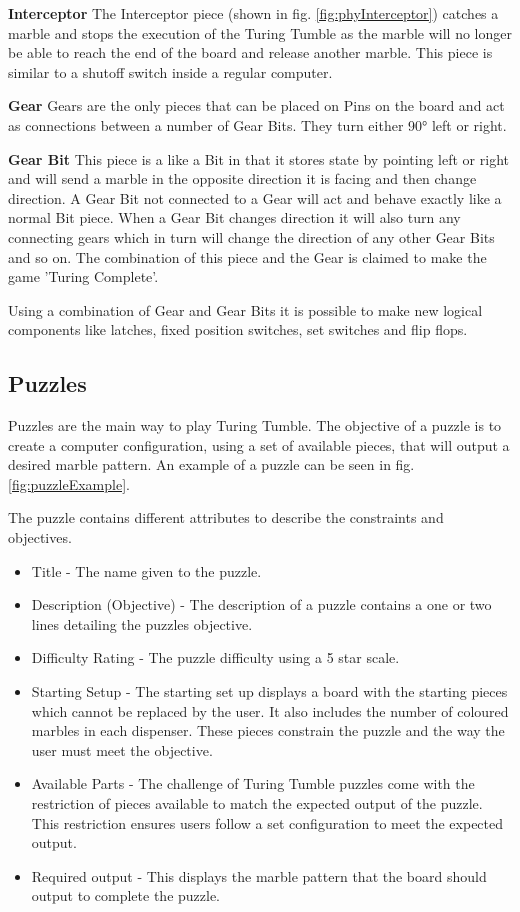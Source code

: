\documentclass{l4proj}
\begin{document}
\textbf{Interceptor}
The Interceptor piece (shown in fig. \ref{fig:phyInterceptor}) catches a marble and stops the execution of the Turing Tumble as the marble will no longer be able to reach the end of the board and release another marble. This piece is similar to a shutoff switch inside a regular computer. 

\textbf{Gear}
Gears are the only pieces that can be placed on Pins on the board and act as connections between a number of Gear Bits. They turn either 90° left or right. 

\textbf{Gear Bit}
This piece is a like a Bit in that it stores state by pointing left or right and will send a marble in the opposite direction it is facing and then change direction. A Gear Bit not connected to a Gear will act and behave exactly like a normal Bit piece. When a Gear Bit changes direction it will also turn any connecting gears which in turn will change the direction of any other Gear Bits and so on. The combination of this piece and the Gear is claimed to make the game 'Turing Complete'.

Using a combination of Gear and Gear Bits it is possible to make new logical components like latches, fixed position switches, set switches and flip flops.

\subsection{Puzzles}
\label{section:puzzle-background}
Puzzles are the main way to play Turing Tumble. The objective of a puzzle is to create a computer configuration, using a set of available pieces, that will output a desired marble pattern. An example of a puzzle can be seen in fig. \ref{fig:puzzleExample}.  

The puzzle contains different attributes to describe the constraints and objectives.
\begin{itemize}
    \item Title - The name given to the puzzle.
    \item Description (Objective) - The description of a puzzle contains a one or two lines detailing the puzzles objective.
    \item Difficulty Rating - The puzzle difficulty using a 5 star scale.
    \item Starting Setup - The starting set up displays a board with the starting pieces which cannot be replaced by the user. It also includes the number of coloured marbles in each dispenser. These pieces constrain the puzzle and the way the user must meet the objective.
    \item Available Parts - The challenge of Turing Tumble puzzles come with the restriction of pieces available to match the expected output of the puzzle. This restriction ensures users follow a set configuration to meet the expected output.
    \item Required output - This displays the marble pattern that the board should output to complete the puzzle.
\end{itemize}
\end{document}
